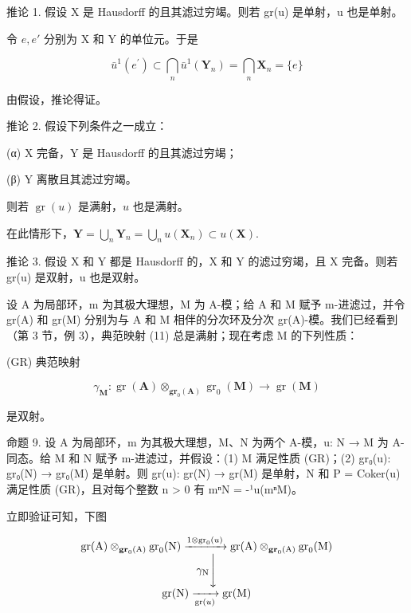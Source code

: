 推论 1. 假设 X 是 Hausdorff 的且其滤过穷竭。则若 gr(u) 是单射，u 也是单射。

令 \(e, e'\) 分别为 X 和 Y 的单位元。于是

\[
\bar {u} ^ {1} (e ^ {\prime}) \subset \bigcap_ {n} \bar {u} ^ {1} (\mathbf {Y} _ {n}) = \bigcap_ {n} \mathbf {X} _ {n} = \{e \}
\]

由假设，推论得证。

推论 2. 假设下列条件之一成立：

(α) X 完备，Y 是 Hausdorff 的且其滤过穷竭；

(β) Y 离散且其滤过穷竭。

则若 \(\operatorname{gr}(u)\) 是满射，\(u\) 也是满射。

	在此情形下，\(\mathbf{Y} = \bigcup_{n}\mathbf{Y}_{n} = \bigcup_{n}u(\mathbf{X}_{n})\subset u(\mathbf{X}).\)

推论 3. 假设 X 和 Y 都是 Hausdorff 的，X 和 Y 的滤过穷竭，且 X 完备。则若 gr(u) 是双射，u 也是双射。

设 A 为局部环，m 为其极大理想，M 为 A-模；给 A 和 M 赋予 m-进滤过，并令 gr(A) 和 gr(M) 分别为与 A 和 M 相伴的分次环及分次 gr(A)-模。我们已经看到（第 3 节，例 3），典范映射 (11) 总是满射；现在考虑 M 的下列性质：

(GR) 典范映射

\[
\gamma_ {\mathbf {M}} \colon \operatorname{gr} (\mathbf {A}) \otimes_ {\mathbf {g r} _ {0} (\mathbf {A})} \operatorname{gr} _ {0} (\mathbf {M}) \rightarrow \operatorname{gr} (\mathbf {M})
\]

是双射。

命题 9. 设 A 为局部环，m 为其极大理想，M、N 为两个 A-模，u: N → M 为 A-同态。给 M 和 N 赋予 m-进滤过，并假设：(1) M 满足性质 (GR)；(2) gr₀(u): gr₀(N) → gr₀(M) 是单射。则 gr(u): gr(N) → gr(M) 是单射，N 和 P = Coker(u) 满足性质 (GR)，且对每个整数 n \textgreater{} 0 有 mⁿN = -¹u(mⁿM)。

立即验证可知，下图

\[
\begin{array}{c} \operatorname{gr} (\mathrm{A}) \otimes_ {\mathbf {g r} _ {0} (\mathrm{A})} \operatorname{gr} _ {0} (\mathrm{N}) \xrightarrow {1 \otimes \operatorname{gr} _ {0} (u)} \operatorname{gr} (\mathrm{A}) \otimes_ {\mathbf {g r} _ {0} (\mathrm{A})} \operatorname{gr} _ {0} (\mathrm{M}) \\ \gamma_ {\mathrm{N}} \Biggl \downarrow \\ \operatorname{gr} (\mathrm{N}) \xrightarrow [ \operatorname{gr} (u) ]{} \operatorname{gr} (\mathrm{M}) \end{array}
\]


